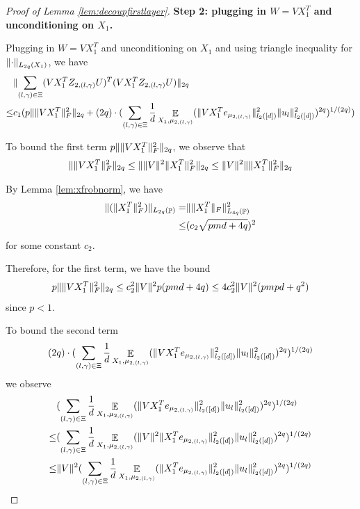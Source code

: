 \documentclass[11pt]{amsart}
\numberwithin{equation}{section}
\numberwithin{equation}{section}
\DeclareMathOperator{\E}{\mathbb{E}}
\DeclareMathOperator{\Pb}{\mathbb{P}}
\DeclarePairedDelimiter{\norm}{\lVert}{\rVert}
\begin{document}
\begin{proof}[Proof of Lemma \ref{lem:decoupfirstlayer}]
\textbf{Step 2: plugging in $W=VX_1^T$ and unconditioning on $X_1$.}

Plugging in $W=VX_1^T$ and unconditioning on $X_1$ and using triangle inequality for $\norm{\cdot}_{L_{2q}(X_1)}$, we have
\begin{align*}
    &\norm{\sum \limits_{(l,\gamma) \in \Xi}(VX_1^TZ_{2,(l,\gamma)}U)^T(VX_1^TZ_{2,(l,\gamma)}U)}_{2q} \\\le& c_1 (p\norm{\norm{VX_1^T}_{F}^2}_{2q}+(2q)\cdot (\sum\limits_{(l,\gamma) \in \Xi}\frac{1}{d}\E_{X_1,\mu_{2,(l,\gamma)}}(\norm{VX_1^Te_{\mu_{2,(l,\gamma)}}}_{l_2([d])}^2\norm{u_l}_{l_2([d])}^{2})^{2q})^{1/(2q)})
\end{align*}

To bound the first term $p\norm{\norm{VX_1^T}_{F}^2}_{2q}$, we observe that
\begin{align*}
    \norm{\norm{VX_1^T}_{F}^2}_{2q} \le \norm{\norm{V}^2\norm{X_1^T}_{F}^2}_{2q} \le \norm{V}^2\norm{\norm{X_1^T}_{F}^2}_{2q} 
\end{align*}

By Lemma \ref{lem:xfrobnorm}, we have
\begin{align*}
    \norm{(\norm{X_1^T}_{F}^2)}_{L_{2q}(\Pb)}=&\norm{\norm{X_1^T}_{F}}_{L_{4q}(\Pb)}^{2} \\\le& (c_2\sqrt{pmd+4q})^2
\end{align*}
for some constant $c_2$.

Therefore, for the first term, we have the bound
\begin{align*}
    p\norm{\norm{VX_1^T}_{F}^2}_{2q}\le c_2^2\norm{V}^2p(pmd+4q) \le 4c_2^2\norm{V}^2(pmpd+q^2)
\end{align*}
since $p<1$.

To bound the second term
\begin{align*}
    (2q)\cdot (\sum\limits_{(l,\gamma) \in \Xi}\frac{1}{d}\E_{X_1,\mu_{2,(l,\gamma)}}(\norm{VX_1^Te_{\mu_{2,(l,\gamma)}}}_{l_2([d])}^2\norm{u_l}_{l_2([d])}^{2})^{2q})^{1/(2q)}
\end{align*}
we observe
\begin{align*}
    &(\sum\limits_{(l,\gamma) \in \Xi}\frac{1}{d}\E_{X_1,\mu_{2,(l,\gamma)}}(\norm{VX_1^Te_{\mu_{2,(l,\gamma)}}}_{l_2([d])}^2\norm{u_l}_{l_2([d])}^{2})^{2q})^{1/(2q)}
    \\ \le & (\sum\limits_{(l,\gamma) \in \Xi}\frac{1}{d}\E_{X_1,\mu_{2,(l,\gamma)}}(\norm{V}^2\norm{X_1^Te_{\mu_{2,(l,\gamma)}}}_{l_2([d])}^2\norm{u_l}_{l_2([d])}^{2})^{2q})^{1/(2q)}
    \\ \le & \norm{V}^2(\sum\limits_{(l,\gamma) \in \Xi}\frac{1}{d}\E_{X_1,\mu_{2,(l,\gamma)}}(\norm{X_1^Te_{\mu_{2,(l,\gamma)}}}_{l_2([d])}^2\norm{u_l}_{l_2([d])}^{2})^{2q})^{1/(2q)}
\end{align*}


\end{proof}
\end{document}
